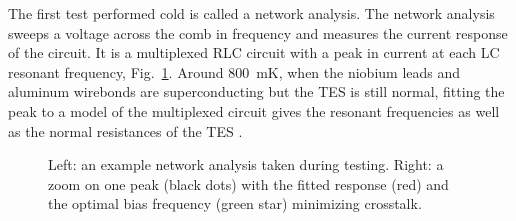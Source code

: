 The first test performed cold is called a network analysis. 
The network analysis sweeps a voltage across the comb in frequency and measures the current response of the circuit. 
It is a multiplexed RLC circuit with a peak in current at each LC resonant frequency, Fig.~\ref{fig:network_analysis}. 
Around 800~mK, when the niobium leads and aluminum wirebonds are superconducting but the TES is still normal, fitting the peak to a model of the multiplexed circuit gives the resonant frequencies as well as the normal resistances of the TES \citep{MacDermid_thesis}. 


\begin{figure}[htbp]
\begin{center}
\caption{Left: an example network analysis taken during testing.
Right: a zoom on one peak (black dots) with the fitted response (red) and the optimal bias frequency (green star) minimizing crosstalk.}
\label{fig:network_analysis}
\end{center}
\end{figure}



